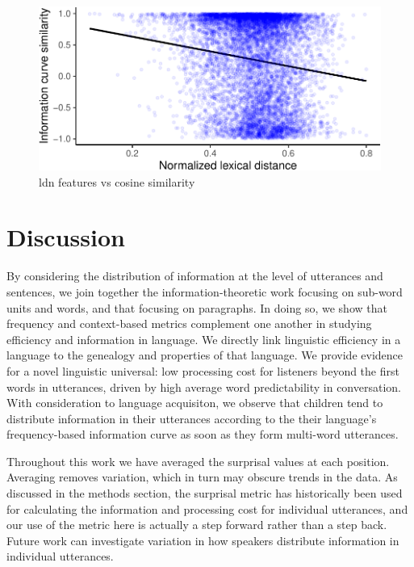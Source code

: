 \documentclass[man,floatsintext]{apa6}
\begin{document}
\begin{figure}
\centering
\includegraphics{figs/cosine-ldn-1.pdf}
\caption{\label{fig:cosine-ldn}ldn features vs cosine similarity}
\end{figure}

\hypertarget{discussion}{%
\section{Discussion}\label{discussion}}

By considering the distribution of information at the level of utterances and sentences, we join together the information-theoretic work focusing on sub-word units and words, and that focusing on paragraphs. In doing so, we show that frequency and context-based metrics complement one another in studying efficiency and information in language. We directly link linguistic efficiency in a language to the genealogy and properties of that language. We provide evidence for a novel linguistic universal: low processing cost for listeners beyond the first words in utterances, driven by high average word predictability in conversation. With consideration to language acquisiton, we observe that children tend to distribute information in their utterances according to the their language's frequency-based information curve as soon as they form multi-word utterances.

Throughout this work we have averaged the surprisal values at each position. Averaging removes variation, which in turn may obscure trends in the data. As discussed in the methods section, the surprisal metric has historically been used for calculating the information and processing cost for individual utterances, and our use of the metric here is actually a step forward rather than a step back. Future work can investigate variation in how speakers distribute information in individual utterances.
\end{document}
